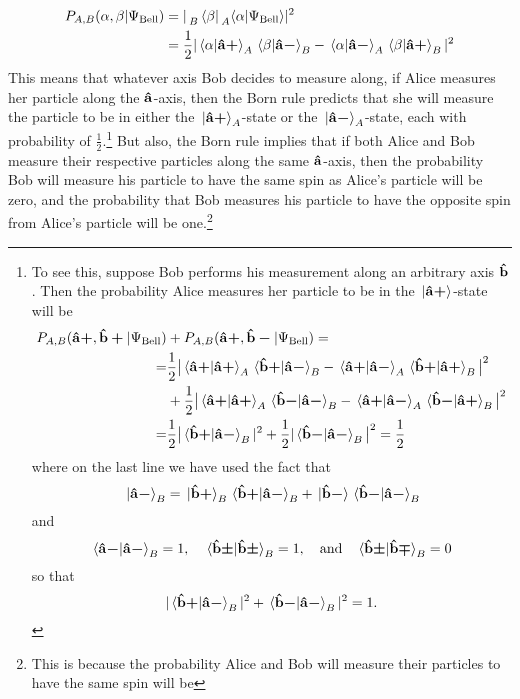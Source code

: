 \begin{equation}
\begin{split}
    P_{A,B}(\alpha,\beta|\Psi_{\text{Bell}})&=|\prescript{}{B}{ \bra*{\beta}}\prescript{}{A}{ \ip{\alpha}{\Psi_{\text{Bell}}}}|^2\\
        &=\frac{1}{2}|\ip*{\alpha}{\uvbp{a}}_A\ip*{\beta}{\uvbm{a}}_B-\ip*{\alpha}{\uvbm{a}}_A\ip*{\beta}{\uvbp{a}}_B|^2
\end{split}
\end{equation}
This means that whatever axis Bob decides to measure along, if Alice measures her particle along the $\vb{\hat{{a}}}$-axis, then the Born rule predicts that she will measure the particle to be in either the $\ket*{\vb{\hat{{a}}}\bm{+}}_A$-state or the $\ket*{\vb{\hat{{a}}}\bm{-}}_A$-state, each with probability of $\frac{1}{2}$.\footnote{To see this, suppose Bob performs his measurement along an arbitrary axis $\vb{\hat{{b}}}$. Then the probability Alice measures her particle to be in the $\ket*{\vb{\hat{{a}}}\bm{+}}$-state will be 
\begin{equation}
    \begin{split}
        P_{A,B}(\uvbp{a},\uvbp{b}|\Psi_{\text{Bell}})&+P_{A,B}(\uvbp{a},\uvbm{b}|\Psi_{\text{Bell}})= \\
        =&\frac{1}{2}\big| \ip*{\uvbp{a}}{\uvbp{a}}_A\ip*{\uvbp{b}}{\uvbm{a}}_B-\ip*{\uvbp{a}}{\uvbm{a}}_A\ip*{\uvbp{b}}{\uvbp{a}}_B\big|^2\\
        &+\frac{1}{2}\big|\ip*{\uvbp{a}}{\uvbp{a}}_A\ip*{\uvbm{b}}{\uvbm{a}}_B-\ip*{\uvbp{a}}{\uvbm{a}}_A\ip*{\uvbm{b}}{\uvbp{a}}_B\big|^2\\
        =&\frac{1}{2}\big|\ip*{\uvbp{b}}{\uvbm{a}}_B|^2+\frac{1}{2}|\ip*{\uvbm{b}}{\uvbm{a}}_B\big|^2=\frac{1}{2}
    \end{split}
\end{equation} 
where on the last line we have used the fact that 
$$\ket*{\uvbm{a}}_B=\ket*{\uvbp{b}}_B\ip*{\uvbp{b}}{\uvbm{a}}_B+\ket*{\uvbm{b}}\ip*{\uvbm{b}}{\uvbm{a}}_B$$
and 
$$\ip*{\uvbm{a}}{\uvbm{a}}_B=1,\quad\ip*{\uvbpm{b}}{\uvbpm{b}}_B=1,\quad\text{and}\quad \ip*{\uvbpm{b}}{\uvbmp{b}}_B=0$$
so that 
$$|\ip*{\uvbp{b}}{\uvbm{a}}_B|^2+\ip*{\uvbm{b}}{\uvbm{a}}_B|^2=1.$$
} But also, the Born rule implies that if both Alice and Bob measure their respective particles along the same $\vb{\hat{{a}}}$-axis, then the probability Bob will measure his particle to have the same spin as Alice's particle will be zero, and the probability that Bob measures his particle to have the opposite spin from Alice's particle will be one.\footnote{This is because the probability Alice and Bob will measure their particles to have the same spin will be 
}
